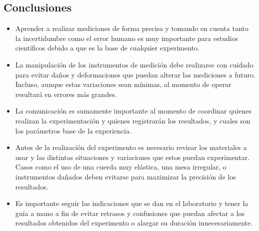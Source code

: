 \subsection{Conclusiones}
\begin{itemize}
	\item Aprender a realizar mediciones de forma precisa y tomando en cuenta tanto la incertidumbre como el error humano es muy importante para estudios científicos debido a que es la base de cualquier experimento.
	\item La manipulación de los instrumentos de medición debe realizarse con cuidado para evitar daños y deformaciones que puedan alterar las mediciones a futuro. Incluso, aunque estas variaciones sean mínimas, al momento de operar resultará en errores más grandes.
	\item La comunicación es sumamente importante al momento de coordinar quienes realizan la experimentación y quienes registrarán los resultados, y cuales son los parámetros base de la experiencia.
	\item Antes de la realización del experimento es necesario revisar los materiales a usar y las distintas situaciones y variaciones que estos puedan experimentar. Casos como el uso de una cuerda muy elástica, una mesa irregular, o instrumentos dañados deben evitarse para maximizar la precisión de los resultados.
	\item Es importante seguir las indicaciones que se dan en el laboratorio y tener la guía a mano a fin de evitar retrasos y confusiones que puedan afectar a los resultados obtenidos del experimento o alargar su duración innecesariamente.

\end{itemize}
